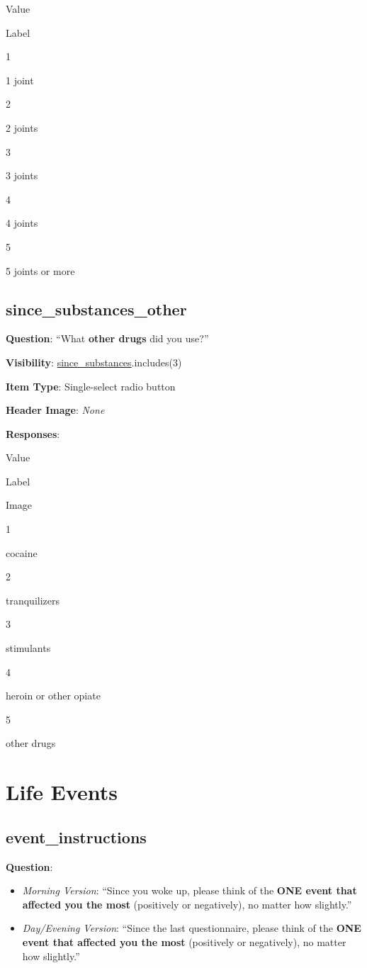 \documentclass[]{book}
\providecommand{\tightlist}{%
  \setlength{\itemsep}{0pt}\setlength{\parskip}{0pt}}
\begin{document}
Value

Label

1

1 joint

2

2 joints

3

3 joints

4

4 joints

5

5 joints or more

\hypertarget{since_substances_other}{%
\section{since\_substances\_other}\label{since_substances_other}}

\textbf{Question}: ``What \textbf{other drugs} did you use?''

\textbf{Visibility}: \protect\hyperlink{since_substances}{since\_substances}.includes(3)

\textbf{Item Type}: Single-select radio button

\textbf{Header Image}: \emph{None}

\textbf{Responses}:

Value

Label

Image

1

cocaine

2

tranquilizers

3

stimulants

4

heroin or other opiate

5

other drugs

\hypertarget{events_section}{%
\chapter{Life Events}\label{events_section}}

\hypertarget{event_instructions}{%
\section{event\_instructions}\label{event_instructions}}

\textbf{Question}:

\begin{itemize}
\tightlist
\item
  \emph{Morning Version}: ``Since you woke up, please think of the \textbf{ONE event that affected you the most} (positively or negatively), no matter how slightly.''
\item
  \emph{Day/Evening Version}: ``Since the last questionnaire, please think of the \textbf{ONE event that affected you the most} (positively or negatively), no matter how slightly.''
\end{itemize}
\end{document}
